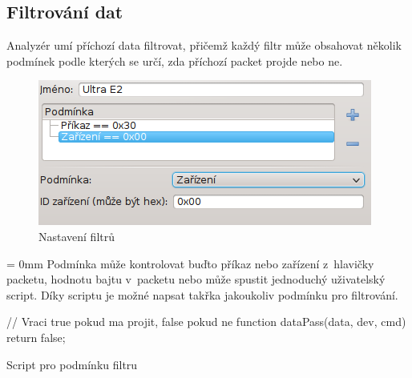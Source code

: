\documentclass[12pt, a4paper, oneside]{article}
\begin{document}
\subsection{Filtrování dat}
Analyzér umí příchozí data filtrovat, přičemž každý filtr může obsahovat několik podmínek podle kterých se určí, zda příchozí packet projde nebo ne.
\begin{figure}[H]
\begin{center}
\includegraphics[scale=0.9]{img/filters.png}
\caption{Nastavení filtrů}
\end{center}
\end{figure}

\addtolength{\textheight}{-30mm}
\newpage
\voffset = 0mm
Podmínka může kontrolovat buďto příkaz nebo zařízení z~hlavičky packetu, hodnotu bajtu v~packetu nebo může spustit jednoduchý uživatelský script. Díky scriptu je možné napsat takřka jakoukoliv podmínku pro filtrování.

\begin{listing}[H]
\begin{jscode}
// Vraci true pokud ma projit, false pokud ne
function dataPass(data, dev, cmd) {
    return false;
}
\end{jscode}
\caption{Script pro podmínku filtru}
\end{listing}

\end{document}
